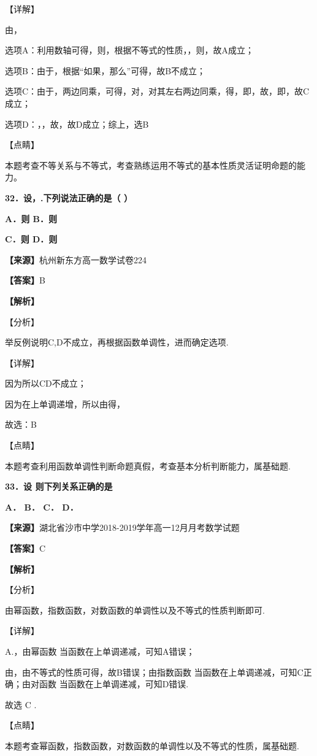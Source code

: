 \documentclass[
]{article}
\begin{document}
【详解】

由，

选项A：利用数轴可得，则，根据不等式的性质，，则，故A成立；

选项B：由于，根据``如果，那么''可得，故B不成立；

选项C：由于，两边同乘，可得，对，对其左右两边同乘，得，即，故，即，故C成立；

选项D：，，故，故D成立；综上，选B

【点睛】

本题考查不等关系与不等式，考查熟练运用不等式的基本性质灵活证明命题的能力。

\textbf{32．设，.下列说法正确的是（ ）}

\textbf{A．则 B．则}

\textbf{C．则 D．则}

\textbf{【来源】}杭州新东方高一数学试卷224

\textbf{【答案】}B

\textbf{【解析】}

【分析】

举反例说明C,D不成立，再根据函数单调性，进而确定选项.

【详解】

因为所以CD不成立；

因为在上单调递增，所以由得，

故选：B

【点睛】

本题考查利用函数单调性判断命题真假，考查基本分析判断能力，属基础题.

\textbf{33．设 则下列关系正确的是}

\textbf{A． B． C． D．}

\textbf{【来源】}湖北省沙市中学2018-2019学年高一12月月考数学试题

\textbf{【答案】}C

\textbf{【解析】}

【分析】

由幂函数，指数函数，对数函数的单调性以及不等式的性质判断即可.

【详解】

A.，由幂函数 当函数在上单调递减，可知A错误；

由，由不等式的性质可得，故B错误；由指数函数
当函数在上单调递减，可知C正确；由对函数 当函数在上单调递减，可知D错误.

故选 C .

【点睛】

本题考查幂函数，指数函数，对数函数的单调性以及不等式的性质，属基础题.
\end{document}
